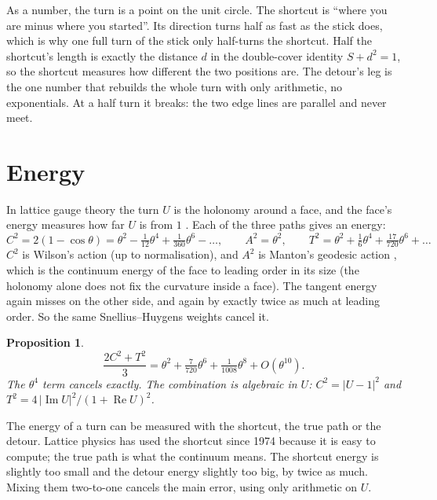 \documentclass[11pt]{article}
\newtheorem{proposition}{Proposition}
\begin{document}
\begin{plain}
As a number, the turn is a point on the unit circle. The shortcut is ``where you are
minus where you started''. Its direction turns half as fast as the stick does, which is
why one full turn of the stick only half-turns the shortcut. Half the shortcut's length is
exactly the distance $d$ in the double-cover identity $S+d^2=1$, so the shortcut measures
how different the two positions are. The detour's leg is the one number that rebuilds the
whole turn with only arithmetic, no exponentials. At a half turn it breaks: the two edge
lines are parallel and never meet.
\end{plain}

\section{Energy}\label{sec:energy}

In lattice gauge theory the turn $U$ is the holonomy around a face, and the face's
energy measures how far $U$ is from $1$ \cite{wilson}. Each of the three paths gives an
energy:
\[
C^2=2(1-\cos\theta)=\theta^2-\tfrac{1}{12}\theta^4+\tfrac{1}{360}\theta^6-\dots,\qquad
A^2=\theta^2,\qquad
T^2=\theta^2+\tfrac16\theta^4+\tfrac{17}{720}\theta^6+\dots
\]
$C^2$ is Wilson's action (up to normalisation), and $A^2$ is Manton's geodesic action
\cite{manton}, which is the continuum energy of the face to leading order in its size (the
holonomy alone does not fix the curvature inside a face). The tangent energy again misses on
the other side, and again by exactly twice as much at leading order. So the same
Snellius--Huygens weights cancel it.

\begin{proposition}\label{prop:energy}
\[
\frac{2C^2+T^2}{3}=\theta^2+\tfrac{7}{720}\theta^6+\tfrac{1}{1008}\theta^8+O(\theta^{10}).
\]
The $\theta^4$ term cancels exactly. The combination is algebraic in $U$:
$C^2=|U-1|^2$ and $T^2=4\,|\operatorname{Im}U|^2/(1+\operatorname{Re}U)^2$.
\end{proposition}

\begin{plain}
The energy of a turn can be measured with the shortcut, the true path or the detour.
Lattice physics has used the shortcut since 1974 because it is easy to compute; the true
path is what the continuum means. The shortcut energy is slightly too small and the detour
energy slightly too big, by twice as much. Mixing them two-to-one cancels the main error,
using only arithmetic on $U$.
\end{plain}
\end{document}
